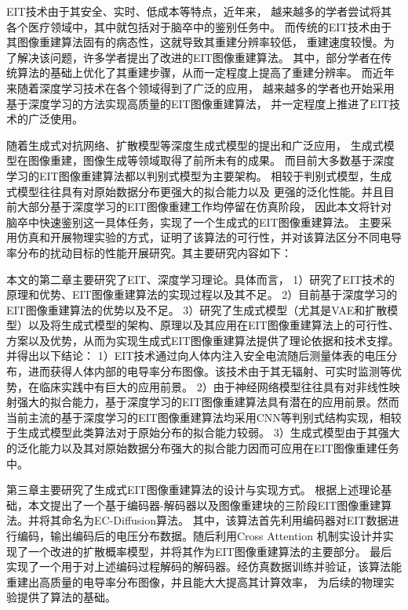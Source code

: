 


EIT技术由于其安全、实时、低成本等特点，近年来，
越来越多的学者尝试将其各个医疗领域中，其中就包括对于脑卒中的鉴别任务中。
而传统的EIT技术由于其图像重建算法固有的病态性，这就导致其重建分辨率较低，
重建速度较慢。为了解决该问题，许多学者提出了改进的EIT图像重建算法。
其中，部分学者在传统算法的基础上优化了其重建步骤，从而一定程度上提高了重建分辨率。
而近年来随着深度学习技术在各个领域得到了广泛的应用，
越来越多的学者也开始采用基于深度学习的方法实现高质量的EIT图像重建算法，
并一定程度上推进了EIT技术的广泛使用。
 
随着生成式对抗网络、扩散模型等深度生成式模型的提出和广泛应用，
生成式模型在图像重建，图像生成等领域取得了前所未有的成果。
而目前大多数基于深度学习的EIT图像重建算法都以判别式模型为主要架构。
相较于判别式模型，生成式模型往往具有对原始数据分布更强大的拟合能力以及
更强的泛化性能。并且目前大部分基于深度学习的EIT图像重建工作均停留在仿真阶段，
因此本文将针对脑卒中快速鉴别这一具体任务，实现了一个生成式的EIT图像重建算法。
主要采用仿真和开展物理实验的方式，证明了该算法的可行性，并对该算法区分不同电导率分布的扰动目标的性能开展研究。其主要研究内容如下：
 
本文的第二章主要研究了EIT、深度学习理论。具体而言，
1）研究了EIT技术的原理和优势、EIT图像重建算法的实现过程以及其不足。
2）目前基于深度学习的EIT图像重建算法的优势以及不足。
3）研究了生成式模型（尤其是VAE和扩散模型）以及将生成式模型的架构、原理以及其应用在EIT图像重建算法上的可行性、方案以及优势，从而为实现生成式EIT图像重建算法提供了理论依据和技术支撑。
并得出以下结论：
1）EIT技术通过向人体内注入安全电流随后测量体表的电压分布，进而获得人体内部的电导率分布图像。该技术由于其无辐射、可实时监测等优势，在临床实践中有巨大的应用前景。
2）由于神经网络模型往往具有对非线性映射强大的拟合能力，基于深度学习的EIT图像重建算法具有潜在的应用前景。然而当前主流的基于深度学习的EIT图像重建算法均采用CNN等判别式结构实现，相较于生成式模型此类算法对于原始分布的拟合能力较弱。
3）生成式模型由于其强大的泛化能力以及其对原始数据分布强大的拟合能力因而可应用在EIT图像重建任务中。

第三章主要研究了生成式EIT图像重建算法的设计与实现方式。
根据上述理论基础，本文提出了一个基于编码器-解码器以及图像重建块的三阶段EIT图像重建算法。并将其命名为EC-Diffusion算法。
其中，该算法首先利用编码器对EIT数据进行编码，输出编码后的电压分布数据。随后利用Cross Attention 机制实设计并实现了一个改进的扩散概率模型，并将其作为EIT图像重建算法的主要部分。
最后实现了一个用于对上述编码过程解码的解码器。经仿真数据训练并验证，该算法能重建出高质量的电导率分布图像，并且能大大提高其计算效率，
为后续的物理实验提供了算法的基础。
 
